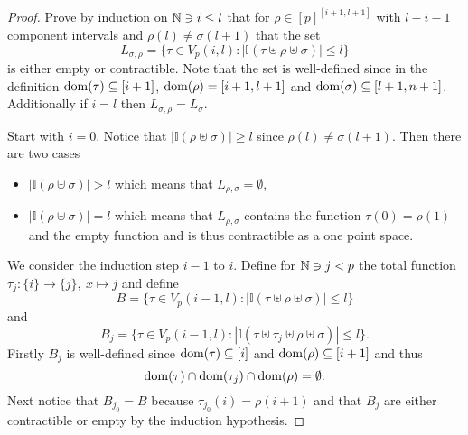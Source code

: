 \begin{proof}
  Prove by induction on $\mathbb{N} \ni i \leq l$ that for $\rho \in [p]^{[i+1,l+1]}$ with $l-i-1$ component intervals and $\rho(l) \neq \sigma(l+1)$ that the set \[L_{\sigma,\rho} = \{\tau \in V_p(i,l)\colon \left|\mathbb{I}(\tau \uplus \rho \uplus \sigma)\right| \leq l \}\]
  is either empty or contractible. Note that the set is well-defined since in the definition ${\rm dom}(\tau) \subseteq [i+1]$, ${\rm dom}(\rho) = [i+1,l+1]$ and ${\rm dom}(\sigma) \subseteq [l+1,n+1]$. Additionally if $i = l$ then $L_{\sigma,\rho} = L_{\sigma}$.

  Start with $i=0$. Notice that $\left|\mathbb{I}(\rho \uplus \sigma)\right| \geq l$ since $\rho(l) \neq \sigma(l+1)$. Then there are two cases
  \begin{itemize}
    \item $\left|\mathbb{I}(\rho \uplus \sigma)\right| > l$ which means that $L_{\rho, \sigma} = \emptyset$,
    \item $\left|\mathbb{I}(\rho \uplus \sigma)\right| = l$ which means that $L_{\rho,\sigma}$ contains the function $\tau(0) = \rho(1)$ and the empty function and is thus contractible as a one point space.
  \end{itemize}

  We consider the induction step $i-1$ to $i$. Define for $\mathbb{N} \ni j < p$ the total function $\tau_j\colon\{i\} \to \{j\}, \: x \mapsto j$ and define
  \begin{equation*}
    B = \{\tau \in V_p(i-1,l)\colon \left| \mathbb{I}(\tau \uplus \rho \uplus \sigma) \right| \leq l\}
  \end{equation*}
  and
  \begin{equation*}
    B_j = \{\tau \in V_p(i-1,l)\colon \left| \mathbb{I}(\tau \uplus \tau_j \uplus \rho \uplus \sigma) \right| \leq l\}.
  \end{equation*}
  Firstly $B_j$ is well-defined since ${\rm dom}(\tau) \subseteq [i]$ and ${\rm dom}(\rho) \subseteq [i+1]$ and thus \[{\rm dom}(\tau) \cap {\rm dom}(\tau_j) \cap {\rm dom}(\rho) = \emptyset.\] Next notice that $B_{j_0} = B$ because $\tau_{j_0}(i) = \rho(i+1)$ and that $B_j$ are either contractible or empty by the induction hypothesis.


\end{proof}
